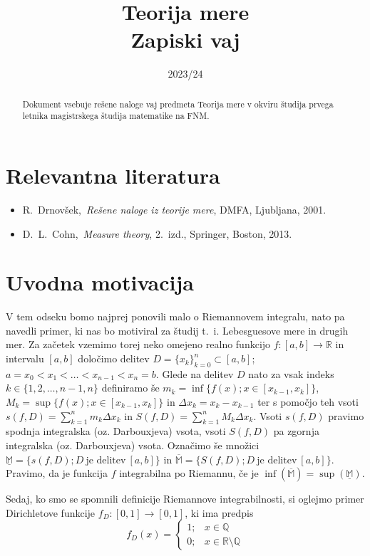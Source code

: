 \documentclass[a4paper, 10pt]{article}
\title{Teorija mere\\ Zapiski vaj}
\date{2023/24}
\newcommand{\mth}[1]{\ensuremath{\mathbb{#1}}}
\newcommand{\R}{\mth{R}}
\newcommand{\map}[3]{\ensuremath{{#1}: {#2} \rightarrow {#3}}}
\begin{document}
	\maketitle
	\newpage
	\begin{abstract}
		\noindent Dokument vsebuje rešene naloge vaj predmeta Teorija mere v okviru študija prvega letnika magistrskega študija matematike na FNM.
	\end{abstract}
	\newpage
	\tableofcontents
	\newpage
	\section{Relevantna literatura}
	\begin{itemize}
		\item R.~Drnovšek,~\emph{Rešene naloge iz teorije mere}, DMFA, Ljubljana, 2001.
		\item D.~L.~Cohn,~\emph{Measure theory}, 2.~izd., Springer, Boston, 2013.
	\end{itemize}
	\section{Uvodna motivacija}
	V tem odseku bomo najprej ponovili malo o Riemannovem integralu, nato pa navedli primer, ki nas bo motiviral za študij t.~i. Lebesguesove mere in drugih mer.
	Za začetek vzemimo torej neko omejeno realno funkcijo \map{f}{[a, b]}{\R} in intervalu $[a, b]$ določimo delitev $D=\{x_k\}^n_{k=0} \subset [a, b]$; $a = x_0 < x_1 < \ldots < x_{n-1} < x_n = b$. Glede na delitev $D$ nato za vsak indeks $k \in \{1, 2, \ldots, n-1, n\}$ definiramo še $m_k = \inf\{f(x); x\in [x_{k-1}, x_k]\}$, $M_k = \sup\{f(x); x\in [x_{k-1}, x_k]\}$ in $\Delta x_k = x_k - x_{k-1}$ ter s pomočjo teh vsoti $s(f, D) = \sum_{k=1}^{n}m_k \Delta x_k$ in $S(f, D) = \sum_{k=1}^{n}M_k \Delta x_k$. Vsoti $s(f, D)$ pravimo spodnja integralska (oz. Darbouxjeva) vsota, vsoti $S(f, D)$ pa zgornja integralska (oz. Darbouxjeva) vsota.
	Označimo še množici $\underline{\mth{M}} = \{s(f, D); D~\text{je delitev}~[a, b]\}$ in $\overline{\mth{M}} = \{S(f, D); D~\text{je delitev}~[a, b]\}$. Pravimo, da je funkcija $f$ integrabilna po Riemannu, če je $\inf(\overline{\mth{M}}) = \sup(\underline{\mth{M}})$.
	
	Sedaj, ko smo se spomnili definicije Riemannove integrabilnosti, si oglejmo primer Dirichletove funkcije \map{f_D}{[0, 1]}{[0, 1]}, ki ima predpis \[f_D(x) = \begin{cases}
	1;& x\in \mth{Q} \\
	0;& x\in \R\setminus\mth{Q}
	\end{cases}\]
	
\end{document}
